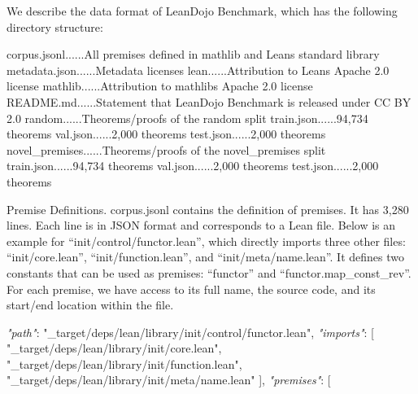 \documentclass[
]{article}
\newenvironment{Shaded}{}{}
\newcommand{\CommentTok}[1]{\textcolor[rgb]{0.38,0.63,0.69}{\textit{#1}}}
\newcommand{\NormalTok}[1]{#1}
\newcommand{\StringTok}[1]{\textcolor[rgb]{0.25,0.44,0.63}{#1}}
\begin{document}
We describe the data format of LeanDojo Benchmark, which has the
following directory structure:

\begin{Shaded}
\begin{Highlighting}[]
\NormalTok{corpus.jsonl......All premises defined in mathlib and Lean\textquotesingle{}s standard library}
\NormalTok{metadata.json......Metadata}
\NormalTok{licenses}
\NormalTok{lean......Attribution to Lean\textquotesingle{}s Apache 2.0 license}
\NormalTok{mathlib......Attribution to mathlib\textquotesingle{}s Apache 2.0 license}
\NormalTok{README.md......Statement that LeanDojo Benchmark is released under CC BY 2.0}
\NormalTok{random......Theorems/proofs of the random split}
\NormalTok{train.json......94,734 theorems}
\NormalTok{val.json......2,000 theorems}
\NormalTok{test.json......2,000 theorems}
\NormalTok{novel\_premises......Theorems/proofs of the novel\_premises split}
\NormalTok{train.json......94,734 theorems}
\NormalTok{val.json......2,000 theorems}
\NormalTok{test.json......2,000 theorems }
\end{Highlighting}
\end{Shaded}

Premise Definitions. corpus.jsonl contains the definition of premises.
It has 3,280 lines. Each line is in JSON format and corresponds to a
Lean file. Below is an example for ``init/control/functor.lean'', which
directly imports three other files: ``init/core.lean'',
``init/function.lean'', and ``init/meta/name.lean''. It defines two
constants that can be used as premises: ``functor'' and
``functor.map\_const\_rev''. For each premise, we have access to its
full name, the source code, and its start/end location within the file.

\begin{Shaded}
\begin{Highlighting}[]
\CommentTok{"path"}\NormalTok{: }\StringTok{"\_target/deps/lean/library/init/control/functor.lean"}\NormalTok{,}
\CommentTok{"imports"}\NormalTok{: [}
    \StringTok{"\_target/deps/lean/library/init/core.lean"}\NormalTok{,}
    \StringTok{"\_target/deps/lean/library/init/function.lean"}\NormalTok{,}
    \StringTok{"\_target/deps/lean/library/init/meta/name.lean"}
\NormalTok{],}
\CommentTok{"premises"}\NormalTok{: [ }
\end{Highlighting}
\end{Shaded}
\end{document}
